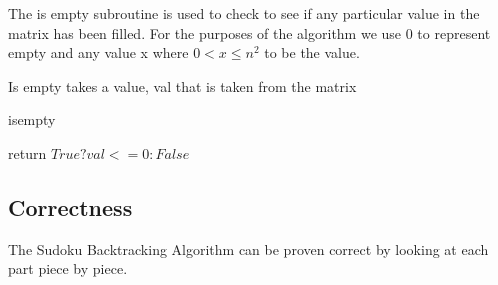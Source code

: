\documentclass{sig-alternate}
\begin{document}
The is empty subroutine is used to check to see if any particular value in the matrix has been filled. 
For the purposes of the algorithm we use 0 to represent empty and any value x where $0 < x \le n^2$ to be the value.

Is empty takes a value, val that is taken from the matrix

\begin{algorithm}[H]
\caption{isempty}\label{isempty}
\begin{algorithmic}[1]

\State return $True ? val <= 0 : False$
\EndProcedure
\end{algorithmic}
\end{algorithm}


\subsection{Correctness}
The Sudoku Backtracking Algorithm can be proven correct by looking at each part piece by piece.
\end{document}
